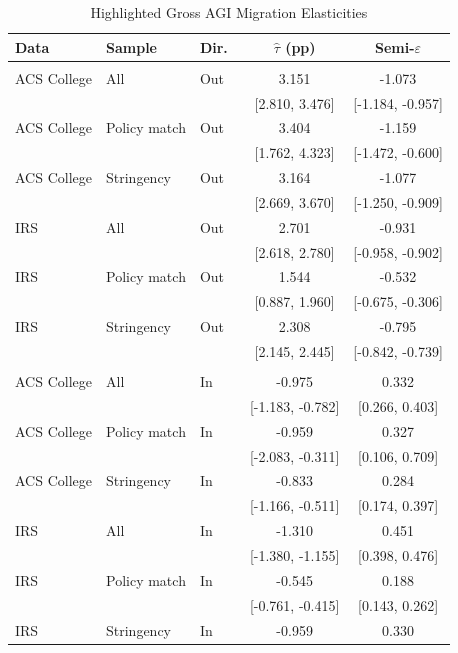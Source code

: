 \begin{table}[htbp]
\centering
\begin{threeparttable}
\footnotesize
\caption{Highlighted Gross AGI Migration Elasticities}
\label{tab:elasticities_inout}
\begin{tabular}{lll cc}
\toprule
Data & Sample & Dir.\ & $\hat{\tau}$ (pp) & Semi-$\varepsilon$ \\
\midrule
\addlinespace
\multicolumn{5}{l}{\textit{Panel A: Out-Migration}} \\
\addlinespace
ACS College & All & Out & 3.151 & -1.073 \\
 & & & [2.810, 3.476] & [-1.184, -0.957] \\
ACS College & Policy match & Out & 3.404 & -1.159 \\
 & & & [1.762, 4.323] & [-1.472, -0.600] \\
ACS College & Stringency & Out & 3.164 & -1.077 \\
 & & & [2.669, 3.670] & [-1.250, -0.909] \\
\addlinespace
IRS & All & Out & 2.701 & -0.931 \\
 & & & [2.618, 2.780] & [-0.958, -0.902] \\
IRS & Policy match & Out & 1.544 & -0.532 \\
 & & & [0.887, 1.960] & [-0.675, -0.306] \\
IRS & Stringency & Out & 2.308 & -0.795 \\
 & & & [2.145, 2.445] & [-0.842, -0.739] \\
\addlinespace[0.75em]
\midrule
\addlinespace
\multicolumn{5}{l}{\textit{Panel B: In-Migration}} \\
\addlinespace
ACS College & All & In & -0.975 & 0.332 \\
 & & & [-1.183, -0.782] & [0.266, 0.403] \\
ACS College & Policy match & In & -0.959 & 0.327 \\
 & & & [-2.083, -0.311] & [0.106, 0.709] \\
ACS College & Stringency & In & -0.833 & 0.284 \\
 & & & [-1.166, -0.511] & [0.174, 0.397] \\
\addlinespace
IRS & All & In & -1.310 & 0.451 \\
 & & & [-1.380, -1.155] & [0.398, 0.476] \\
IRS & Policy match & In & -0.545 & 0.188 \\
 & & & [-0.761, -0.415] & [0.143, 0.262] \\
IRS & Stringency & In & -0.959 & 0.330 \\

\end{tabular}
\end{threeparttable}
\end{table}
